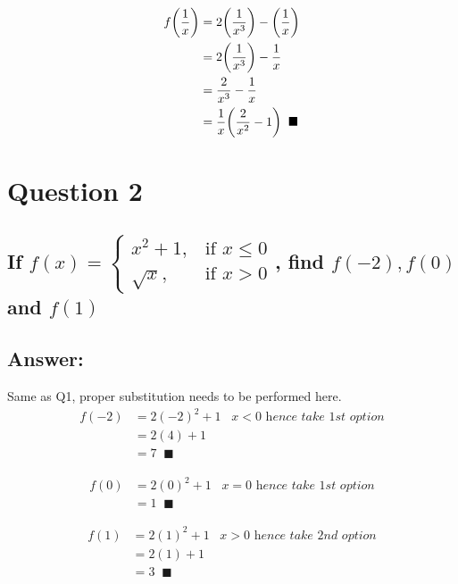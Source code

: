 \documentclass[17 pt]{extarticle}
\begin{document}
\begin{equation*}
    \begin{split}
        f \biggl \lparen \frac{1}{x} \biggr \rparen &= 2\biggl \lparen \frac{1}{x^3} \biggr \rparen - \biggl \lparen \frac{1}{x} \biggr \rparen \\
        & = 2 \biggl \lparen \frac{1}{x^3} \biggr \rparen - \frac{1}{x} \\
        &= \frac{2}{x^3} - \frac{1}{x} \\
        &= \frac{1}{x} \biggl \lparen \frac{2}{x^2} - 1 \biggr \rparen \; \; \blacksquare
    \end{split}
\end{equation*}

\newpage
\section{Question 2}

\subsection*{If $f(x) = \begin{cases} x^2+1, & \text{if } x \leq 0 \\
\sqrt x, & \text{if } x > 0 \end{cases}$, find $f(-2), f(0)$ and $f(1)$}

\vspace{10mm}

\subsection*{Answer:}

Same as Q1, proper substitution needs to be performed here. 
\begin{equation*}
    \begin{split}
        f(-2) &= 2(-2)^2 + 1 \; \; \; \textit{$x <  0$ hence take 1st option} \\
        & = 2(4) + 1 \\
        &= 7 \; \; \blacksquare
    \end{split}
    \end{equation*}

    \begin{equation*}
        \begin{split}
            f(0) &= 2(0)^2 + 1 \; \; \; \textit{$x = 0$ hence take 1st option} \\
            &= 1 \; \; \blacksquare
        \end{split}
        \end{equation*}

        \begin{equation*}
            \begin{split}
                f(1) &= 2(1)^2 + 1 \; \; \; \textit{$x > 0$ hence take 2nd option} \\
                &= 2(1) + 1 \\
                &= 3 \; \; \blacksquare
            \end{split}
            \end{equation*}
\end{document}
